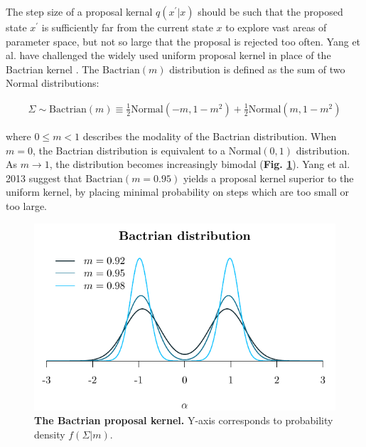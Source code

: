 \documentclass[10pt,letterpaper]{article}
\begin{document}

The step size of a proposal kernal $q(x^\prime|x)$ should be such that the proposed state $x^\prime$ is sufficiently far from the current state $x$ to explore vast areas of parameter space, but not so large that the proposal is rejected too often. Yang et al. have challenged the widely used uniform proposal kernel in place of the Bactrian kernel \cite{yang2013searching, thawornwattana2018designing}.
The $\text{Bactrian}(m)$ distribution is defined as the sum of two Normal distributions:


\begin{align}
	\Sigma \sim \text{Bactrian}(m) \equiv \frac{1}{2}\text{Normal}(-m, 1-m^2) + \frac{1}{2}\text{Normal}(m, 1-m^2)
\end{align}


where $0 \leq m < 1$ describes the modality of the Bactrian distribution. When $m=0$, the Bactrian distribution is equivalent to a $\text{Normal}(0, 1)$ distribution. As $m \rightarrow 1$, the distribution becomes increasingly bimodal (\textbf{Fig. \ref{fig:bactrian}}). Yang et al. 2013 \cite{yang2013searching} suggest that $\text{Bactrian}(m=0.95)$ yields a proposal kernel superior to the uniform kernel, by placing minimal probability on steps which are too small or too large.



\begin{figure}[!h]
\includegraphics[width=\textwidth]{Figures/bactrian.pdf}
\caption{\textbf{The Bactrian proposal kernel.} Y-axis corresponds to probability density $f(\Sigma|m)$.  }
\label{fig:bactrian}
\end{figure}
\end{document}
